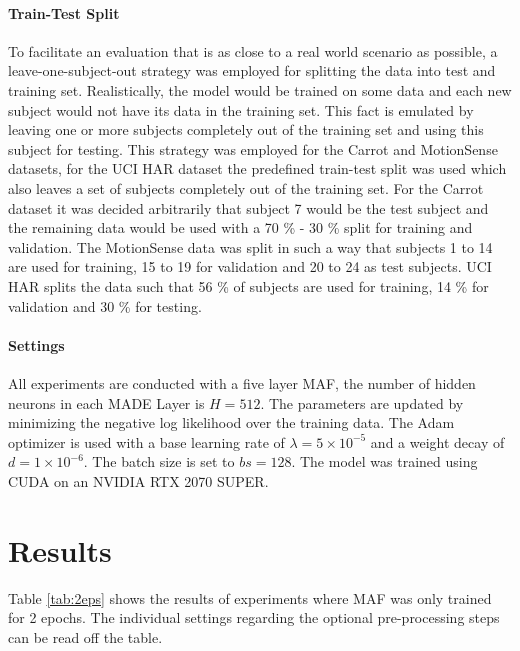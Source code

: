 \documentclass[11pt,titlepage,oneside,openany]{book}
\begin{document}
\paragraph{Train-Test Split}
To facilitate an evaluation that is as close to a real world scenario as possible, a leave-one-subject-out strategy was employed for splitting the data into test and training set. Realistically, the model would be trained on some data and each new subject would not have its data in the training set. This fact is emulated by leaving one or more subjects completely out of the training set and using this subject for testing. This strategy was employed for the Carrot and MotionSense datasets, for the UCI HAR dataset the predefined train-test split was used which also leaves a set of subjects completely out of the training set. For the Carrot dataset it was decided arbitrarily that subject 7 would be the test subject and the remaining data would be used with a 70 \% - 30 \% split for training and validation.  The MotionSense data was split in such a way that subjects 1 to 14 are used for training, 15 to 19 for validation and  20 to 24 as test subjects. UCI HAR splits the data such that 56 \% of subjects are used for training, 14 \% for validation and 30 \% for testing.

\paragraph{Settings}
All experiments are conducted with a five layer MAF, the number of hidden neurons in each MADE Layer is $H=512$. The parameters are updated by minimizing the negative log likelihood over the training data. The Adam optimizer is used with a base learning rate of $\lambda = 5 \times 10^{-5}$ and a weight decay of $d = 1 \times 10^{-6}$. The batch size is set to $bs = 128$. The model was trained using CUDA on an NVIDIA RTX 2070 SUPER.


\section{Results}
\label{sec:results}
Table \ref{tab:2eps} shows the results of experiments where MAF was only trained for 2 epochs. The individual settings regarding the optional pre-processing steps can be read off the table.
\end{document}
